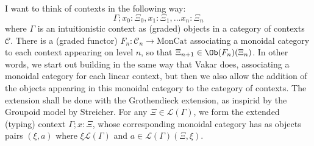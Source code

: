 I want to think of contexts in the following way:
\[
\Gamma; x_0: \Xi_0, x_1 : \Xi_1, \dots x_n : \Xi_n
\]
where $\Gamma$ is an intuitionistic context as (graded) objects in a category of contexts $\mathcal{C}$. There is a (graded functor) $F_{n} : \mathcal{C}_n \to \text{MonCat}$ associating a monoidal category to each context appearing on level $n$, so that $\Xi_{n +1} \in \Ob(F_{n})(\Xi_n)$. In other words, we start out building in the same way that Vakar does, associating a monoidal category for each linear context, but then we also allow the addition of the objects appearing in this monoidal category to the category of contexts. The extension shall be done with the Grothendieck extension, as inspirid by the Groupoid model by Streicher. For any $\Xi \in \mathcal{L}(\Gamma)$, we form the extended (typing) context $\Gamma; x : \Xi$, whose corresponding monoidal category has as objects pairs $(\xi, a)$ where $\xi \mathcal{L}(\Gamma)$ and $a \in \mathcal{L}(\Gamma)(\Xi, \xi)$.


